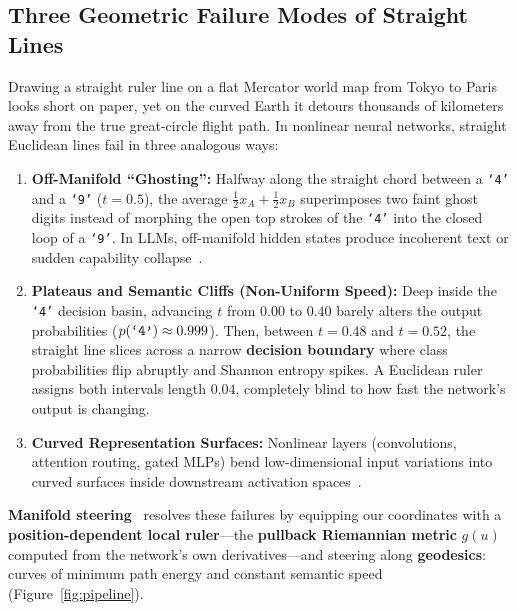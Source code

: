 \documentclass[11pt,a4paper]{article}
\theoremstyle{definition}
\begin{document}
\subsection{Three Geometric Failure Modes of Straight Lines}

Drawing a straight ruler line on a flat Mercator world map from Tokyo to Paris looks short on paper, yet on the curved Earth it detours thousands of kilometers away from the true great-circle flight path. In nonlinear neural networks, straight Euclidean lines fail in three analogous ways:

\begin{enumerate}[leftmargin=*]
    \item \textbf{Off-Manifold ``Ghosting'':} Halfway along the straight chord between a \texttt{`4'} and a \texttt{`9'} ($t = 0.5$), the average $\frac{1}{2}x_A + \frac{1}{2}x_B$ superimposes two faint ghost digits instead of morphing the open top strokes of the \texttt{`4'} into the closed loop of a \texttt{`9'}. In LLMs, off-manifold hidden states produce incoherent text or sudden capability collapse~\cite{wurgaft2026manifold,oozeer2026riemannian}.
    \item \textbf{Plateaus and Semantic Cliffs (Non-Uniform Speed):} Deep inside the \texttt{`4'} decision basin, advancing $t$ from $0.00$ to $0.40$ barely alters the output probabilities ($p(\text{\texttt{`4'}}) \approx 0.999$). Then, between $t = 0.48$ and $t = 0.52$, the straight line slices across a narrow \textbf{decision boundary} where class probabilities flip abruptly and Shannon entropy spikes. A Euclidean ruler assigns both intervals length $0.04$, completely blind to how fast the network's output is changing.
    \item \textbf{Curved Representation Surfaces:} Nonlinear layers (convolutions, attention routing, gated MLPs) bend low-dimensional input variations into curved surfaces inside downstream activation spaces~\cite{arvanitidis2018oddity,engels2024nonlinear}.
\end{enumerate}

\textbf{Manifold steering}~\cite{wurgaft2026manifold,oozeer2026riemannian,kazama2026geosteer} resolves these failures by equipping our coordinates with a \textbf{position-dependent local ruler}---the \textbf{pullback Riemannian metric} $g(u)$ computed from the network's own derivatives---and steering along \textbf{geodesics}: curves of minimum path energy and constant semantic speed (Figure~\ref{fig:pipeline}).
\end{document}
